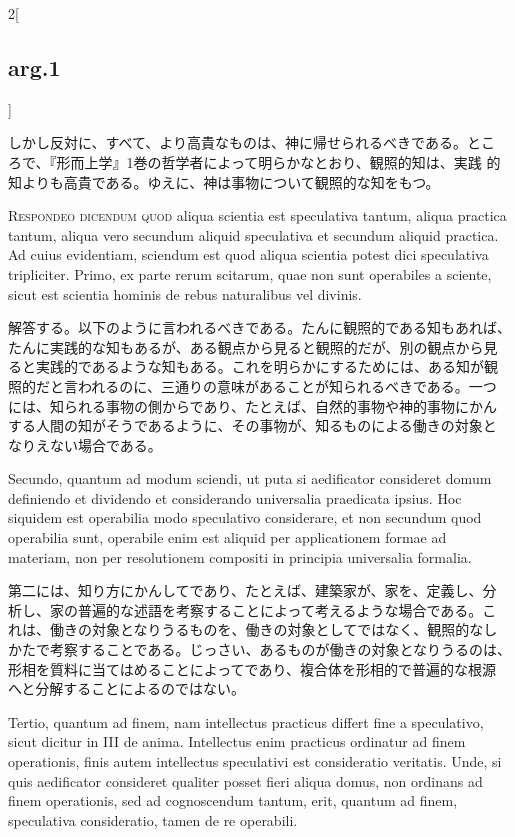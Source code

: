 \documentclass[paper=a4paper,fontsize=10pt,jafontsize=9pt,titlepage]{jlreq}
\begin{document}
\begin{paracol}{2}[\subsection{arg.1}]
\switchcolumn

しかし反対に、すべて、より高貴なものは、神に帰せられるべきである。とこ
ろで、『形而上学』1巻の哲学者によって明らかなとおり、観照的知は、実践
的知よりも高貴である。ゆえに、神は事物について観照的な知をもつ。


{\scshape Respondeo dicendum quod} aliqua scientia est speculativa
tantum, aliqua practica tantum, aliqua vero secundum aliquid
speculativa et secundum aliquid practica. Ad cuius evidentiam,
sciendum est quod aliqua scientia potest dici speculativa
tripliciter. Primo, ex parte rerum scitarum, quae non sunt operabiles
a sciente, sicut est scientia hominis de rebus naturalibus vel
divinis.

\switchcolumn

解答する。以下のように言われるべきである。たんに観照的である知もあれば、
たんに実践的な知もあるが、ある観点から見ると観照的だが、別の観点から見
ると実践的であるような知もある。これを明らかにするためには、ある知が観
照的だと言われるのに、三通りの意味があることが知られるべきである。一つ
には、知られる事物の側からであり、たとえば、自然的事物や神的事物にかん
する人間の知がそうであるように、その事物が、知るものによる働きの対象と
なりえない場合である。

\switchcolumn*

Secundo, quantum ad modum sciendi, ut puta si aedificator consideret
domum definiendo et dividendo et considerando universalia praedicata
ipsius. Hoc siquidem est operabilia modo speculativo considerare, et
non secundum quod operabilia sunt, operabile enim est aliquid per
applicationem formae ad materiam, non per resolutionem compositi in
principia universalia formalia.

\switchcolumn

第二には、知り方にかんしてであり、たとえば、建築家が、家を、定義し、分
析し、家の普遍的な述語を考察することによって考えるような場合である。こ
れは、働きの対象となりうるものを、働きの対象としてではなく、観照的なし
かたで考察することである。じっさい、あるものが働きの対象となりうるのは、
形相を質料に当てはめることによってであり、複合体を形相的で普遍的な根源
へと分解することによるのではない。

\switchcolumn*

Tertio, quantum ad finem, nam intellectus practicus differt fine a
speculativo, sicut dicitur in III de anima. Intellectus enim practicus
ordinatur ad finem operationis, finis autem intellectus speculativi
est consideratio veritatis. Unde, si quis aedificator consideret
qualiter posset fieri aliqua domus, non ordinans ad finem operationis,
sed ad cognoscendum tantum, erit, quantum ad finem, speculativa
consideratio, tamen de re operabili.


\end{paracol}
\end{document}

